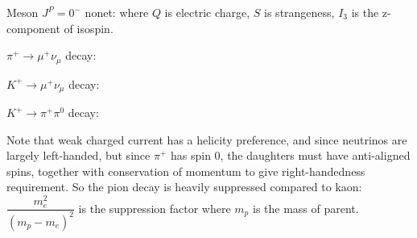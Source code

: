 \draft

Meson $J^P = 0^-$ nonet:
where $Q$ is electric charge, $S$ is strangeness, $I_3$ is the z-component of isospin.

$\pi^+ \to \mu^+ \nu_\mu$ decay:

$K^+ \to \mu^+ \nu_\mu$ decay:

$K^+ \to \pi^+ \pi^0$ decay:

Note that weak charged current has a helicity preference, and since neutrinos are largely left-handed, but since $\pi^+$ has spin 0, the daughters must have anti-aligned spins, together with conservation of momentum to give right-handedness requirement.
So the pion decay is heavily suppressed compared to kaon: $\dfrac{m_e^2}{(m_p - m_e)^2}$ is the suppression factor where $m_p$ is the mass of parent.

